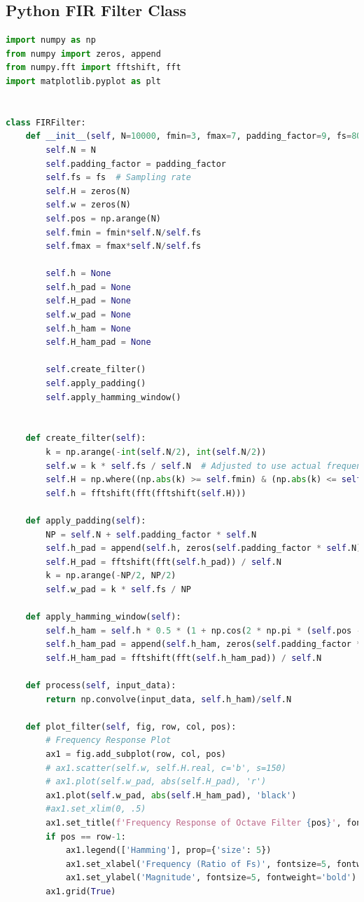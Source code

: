 \documentclass[a4paper, 11pt]{exam}
\begin{document}
\subsection{Python FIR Filter Class}
\label{app_sub_FIR_create}
\begin{lstlisting}[language=Python]
import numpy as np
from numpy import zeros, append
from numpy.fft import fftshift, fft
import matplotlib.pyplot as plt


class FIRFilter:
    def __init__(self, N=10000, fmin=3, fmax=7, padding_factor=9, fs=8000):
        self.N = N
        self.padding_factor = padding_factor
        self.fs = fs  # Sampling rate
        self.H = zeros(N)
        self.w = zeros(N)
        self.pos = np.arange(N)
        self.fmin = fmin*self.N/self.fs
        self.fmax = fmax*self.N/self.fs
        
        self.h = None
        self.h_pad = None
        self.H_pad = None
        self.w_pad = None
        self.h_ham = None
        self.H_ham_pad = None
        
        self.create_filter()
        self.apply_padding()
        self.apply_hamming_window()


    def create_filter(self):
        k = np.arange(-int(self.N/2), int(self.N/2))
        self.w = k * self.fs / self.N  # Adjusted to use actual frequency values
        self.H = np.where((np.abs(k) >= self.fmin) & (np.abs(k) <= self.fmax), 1, 0)
        self.h = fftshift(fft(fftshift(self.H)))

    def apply_padding(self):
        NP = self.N + self.padding_factor * self.N
        self.h_pad = append(self.h, zeros(self.padding_factor * self.N))
        self.H_pad = fftshift(fft(self.h_pad)) / self.N
        k = np.arange(-NP/2, NP/2)
        self.w_pad = k * self.fs / NP

    def apply_hamming_window(self):
        self.h_ham = self.h * 0.5 * (1 + np.cos(2 * np.pi * (self.pos - self.N / 2) / self.N))
        self.h_ham_pad = append(self.h_ham, zeros(self.padding_factor * self.N))
        self.H_ham_pad = fftshift(fft(self.h_ham_pad)) / self.N

    def process(self, input_data):
        return np.convolve(input_data, self.h_ham)/self.N

    def plot_filter(self, fig, row, col, pos):
        # Frequency Response Plot
        ax1 = fig.add_subplot(row, col, pos)
        # ax1.scatter(self.w, self.H.real, c='b', s=150)
        # ax1.plot(self.w_pad, abs(self.H_pad), 'r')
        ax1.plot(self.w_pad, abs(self.H_ham_pad), 'black')
        #ax1.set_xlim(0, .5)
        ax1.set_title(f'Frequency Response of Octave Filter {pos}', fontsize=5, fontweight='bold')
        if pos == row-1:            
            ax1.legend(['Hamming'], prop={'size': 5})
            ax1.set_xlabel('Frequency (Ratio of Fs)', fontsize=5, fontweight='bold')
            ax1.set_ylabel('Magnitude', fontsize=5, fontweight='bold')
        ax1.grid(True)


\end{lstlisting}
\end{document}
